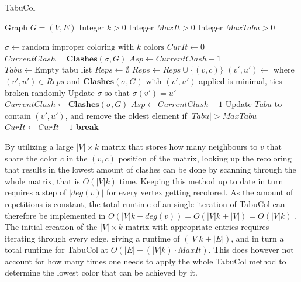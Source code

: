 \documentclass[a4paper]{article}
\newcommand{\algorithmicbreak}{\textbf{break}}
\newcommand{\BREAK}{\STATE \algorithmicbreak}
\begin{document}
\begin{algorithm}[H]
    \caption{TabuCol}
    \begin{algorithmic}[1]
        \REQUIRE Graph $G = (V,E)$
        \REQUIRE Integer $k > 0$
        \REQUIRE Integer $MaxIt > 0$
        \REQUIRE Integer $MaxTabu > 0$
      
        \STATE $\sigma \leftarrow \text{random improper coloring with $k$ colors}$
        \STATE $CurIt \leftarrow 0$
        \STATE $CurrentClash = \textbf{Clashes}(\sigma,G)$
        \STATE $Asp \leftarrow CurrentClash-1$
        \STATE $Tabu \leftarrow \text{Empty tabu list}$
            \STATE $Reps \leftarrow \emptyset$
                        \STATE $Reps \leftarrow Reps \cup \{(v,c)\}$
                    \ENDIF
                \ENDFOR
            \ENDFOR
            \STATE $(v',u') \leftarrow $ where $(v',u') \in Reps$ and $\textbf{Clashes}(\sigma,G)$ with $(v',u')$ applied is minimal, ties broken randomly
            \STATE Update $\sigma$ so that $\sigma(v') = u'$
            \STATE $CurrentClash \leftarrow \textbf{Clashes}(\sigma,G)$
                \STATE $Asp \leftarrow CurrentClash -1$
            \ENDIF
            \STATE Update $Tabu$ to contain $(v',u')$, and remove the oldest element if $|Tabu| > MaxTabu$
            \STATE $CurIt \leftarrow CurIt + 1$
                \BREAK
            \ENDIF
        \ENDWHILE
    \end{algorithmic}
\end{algorithm}

By utilizing a large $|V| \times k$ matrix that stores how many neighbours to $v$ that share
the color $c$ in the $(v,c)$ position of the matrix, looking up the recoloring
that results in the lowest amount of clashes can be done by scanning through 
the whole matrix, that is $O(|V|k)$ time.
Keeping this method up to date in turn requires a step of $|deg(v)|$ for every
vertex getting recolored.  As the amount of repetitions is constant, the total
runtime of an single iteration of TabuCol can therefore be implemented in
$O(|V|k+deg(v)) = O(|V|k+|V|) = O(|V|k)$ \cite{Constructive}. The initial
creation of the $|V| \times k$ matrix with appropriate entries requires
iterating through every edge, giving a runtime of $(|V|k+|E|)$, and in turn a 
total runtime for TabuCol at $O(|E|+(|V|k)\cdot MaxIt)$. This does however
not account for how many times one needs to apply the whole TabuCol method to
determine the lowest color that can be achieved by it.
\end{document}
